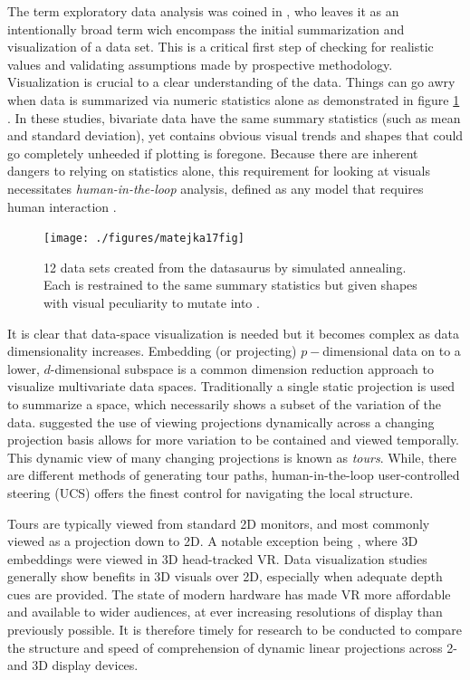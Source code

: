 \documentclass{monashthesis}
\begin{document}
The term exploratory data analysis was coined in \textcite{tukey_exploratory_1977}, who leaves it as an intentionally broad term wich encompass the initial summarization and visualization of a data set. This is a critical first step of checking for realistic values and validating assumptions made by prospective methodology. Visualization is crucial to a clear understanding of the data. Things can go awry when data is summarized via numeric statistics alone \autocite{anscombe_graphs_1973} as demonstrated in figure \ref{fig:matejka17fig} \autocite{matejka_same_2017}. In these studies, bivariate data have the same summary statistics (such as mean and standard deviation), yet contains obvious visual trends and shapes that could go completely unheeded if plotting is foregone. Because there are inherent dangers to relying on statistics alone, this requirement for looking at visuals necessitates \emph{human-in-the-loop} analysis, defined as any model that requires human interaction \autocite{karwowski_international_2006}.



\begin{figure}

{\centering \texttt{[image: ./figures/matejka17fig]} 

}

\caption{12 data sets created from the datasaurus by simulated annealing. Each is restrained to the same summary statistics but given shapes with visual peculiarity to mutate into \autocite{matejka_same_2017}.}\label{fig:matejka17fig}
\end{figure}

It is clear that data-space visualization is needed but it becomes complex as data dimensionality increases. Embedding (or projecting) \(p-\)dimensional data on to a lower, \(d\)-dimensional subspace is a common dimension reduction approach to visualize multivariate data spaces. Traditionally a single static projection is used to summarize a space, which necessarily shows a subset of the variation of the data. \textcite{asimov_grand_1985} suggested the use of viewing projections dynamically across a changing projection basis allows for more variation to be contained and viewed temporally. This dynamic view of many changing projections is known as \emph{tours}. While, there are different methods of generating tour paths, human-in-the-loop user-controlled steering (UCS) offers the finest control for navigating the local structure.

Tours are typically viewed from standard 2D monitors, and most commonly viewed as a projection down to 2D. A notable exception being \textcite{nelson_xgobi_1998}, where 3D embeddings were viewed in 3D head-tracked VR. Data visualization studies generally show benefits in 3D visuals over 2D, especially when adequate depth cues are provided. The state of modern hardware has made VR more affordable and available to wider audiences, at ever increasing resolutions of display than previously possible. It is therefore timely for research to be conducted to compare the structure and speed of comprehension of dynamic linear projections across 2- and 3D display devices.
\end{document}
